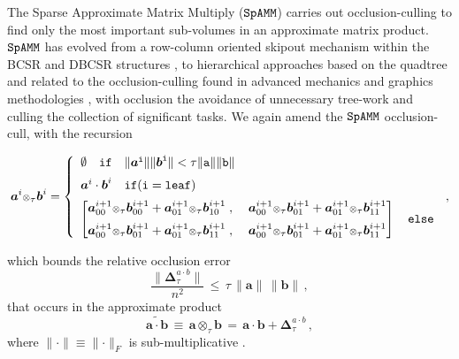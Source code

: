 \documentclass[letterpaper,twocolumn,amsmath,amsfont,amssymb,english,aps,jcp,preprintnumbers,groupaddress,nofootinbib,tightenlines,floatfix]{revtex4}
\newcommand{\mat}[1]{\boldsymbol{#1}}
\newcommand{\ot}{  {\scriptstyle \otimes}_{ \tau } }
\theoremstyle{plain}
\theoremstyle{remark}
\theoremstyle{plain}
\begin{document}
The Sparse Approximate Matrix Multiply ($\tt SpAMM$) carries out occlusion-culling to find only the
most important sub-volumes in an approximate matrix product. 
$\tt SpAMM$ has evolved from a row-column oriented skipout mechanism within the
BCSR and DBCSR structures \cite{challacombe1999simplified,Challacombe:2000:SpMM}, 
to hierarchical approaches based on the quadtree and related to 
the occlusion-culling found in advanced mechanics and graphics methodologies \cite{Challacombe2010}, 
with occlusion the avoidance of unnecessary tree-work and culling the collection of significant tasks. 
We again amend the $\tt SpAMM$ occlusion-cull,  with the recursion
\begin{widetext}
\begin{equation}\label{newspamm}
\mat{a}^{i} \ot \mat{b}^{i} =
\left\{
        \begin{array}{ll}
                 \emptyset \quad \tt{if}\quad \lVert \mat{a}^i \rVert \lVert \mat{b}^i \rVert < \tau \lVert a \rVert \lVert b \rVert \\[0.2cm]
                 \mat{a} ^i \cdot \mat{b}^i \quad  \tt{if}(i=\tt{leaf}) \\[0.2cm]
\begin{bmatrix} \mat{a}^{i+1}_{00} \ot \mat{b}^{i+1}_{00} +\mat{a}^{i+1}_{01} \ot \mat{b}^{i+1}_{10} \; , \; &
                \mat{a}^{i+1}_{00} \ot \mat{b}^{i+1}_{01} +\mat{a}^{i+1}_{01} \ot \mat{b}^{i+1}_{11}  \\[0.2cm]
                \mat{a}^{i+1}_{00} \ot \mat{b}^{i+1}_{01} +\mat{a}^{i+1}_{01} \ot \mat{b}^{i+1}_{11} \; , \; &
                \mat{a}^{i+1}_{00} \ot \mat{b}^{i+1}_{01} +\mat{a}^{i+1}_{01} \ot \mat{b}^{i+1}_{11}
\end{bmatrix}  \quad \tt{else}
                \end{array}
              \right.  \, ,
\end{equation}
\end{widetext}
which bounds the relative occlusion error
\begin{equation}\label{bound}
\frac{\lVert \mat{\Delta}^{a \cdot b}_{\tau} \rVert}{n^2 }  \, \leq \, \tau \, \lVert \mat{a} \rVert  \,  \lVert \mat{b} \rVert \, ,
\end{equation}
that occurs in the approximate product
\begin{equation}
\widetilde{\mat{a}\cdot \mat{b}} \,  \equiv \, \mat{a} \ot \mat{b} \,
  = \, \mat{a} \cdot \mat{b} + \mat{\Delta}^{a \cdot b}_{\tau} \, ,
\end{equation}
where $\lVert \cdot \rVert \equiv \lVert \cdot \rVert_F$ is sub-multiplicative \cite{Kahan2013}.
\end{document}
